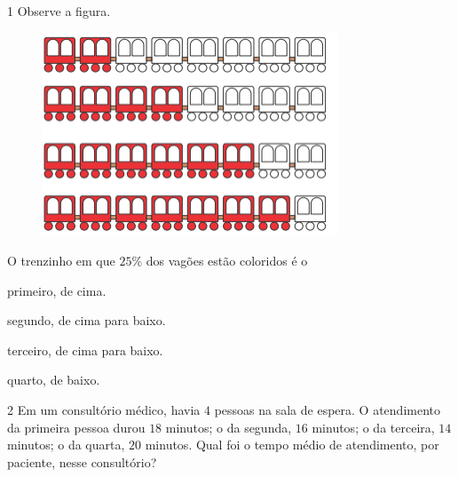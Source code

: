 \num{1} Observe a figura.

\begin{figure}[H]
\centering\includegraphics[width=3.46528in,height=2.38403in]{./imgSAEB_6_MAT/media/image89.png}
\end{figure}

O trenzinho em que $25\%$ dos vagões estão coloridos é o

\begin{escolha}
\item primeiro, de cima.
\item segundo, de cima para baixo.
\item terceiro, de cima para baixo.
\item quarto, de baixo.
\end{escolha}



\num{2}  Em um consultório médico, havia $4$ pessoas na sala de espera. O
atendimento da primeira pessoa durou $18$ minutos; o da segunda, $16$
minutos; o da terceira, $14$ minutos; o da quarta, $20$ minutos.
Qual foi o tempo médio de atendimento, por paciente, nesse consultório?

